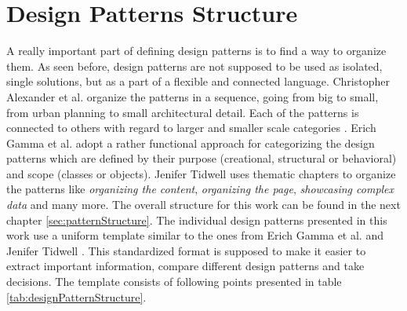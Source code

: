 \section{Design Patterns Structure}
A really important part of defining design patterns is to find a way to organize them. As seen before, design patterns are not supposed to be used as isolated, single solutions, but as a part of a flexible and connected language. Christopher Alexander et al. \cite{alexander1977pattern} organize the patterns in a sequence, going from big to small, from urban planning to small architectural detail. Each of the patterns is connected to others with regard to larger and smaller scale categories \cite[p.\,10--36]{alexander1977pattern}.  Erich Gamma et al. \cite{gamma1995design} adopt a rather functional approach for categorizing the design patterns which are defined by their purpose (creational, structural or behavioral) and scope (classes or objects). Jenifer Tidwell \cite{tidwell2010designing} uses thematic chapters to organize the patterns like \emph{organizing the content}, \emph{organizing the page}, \emph{showcasing complex data} and many more. The overall structure for this work can be found in the next chapter \ref{sec:patternStructure}. The individual design patterns presented in this work use a uniform template similar to the ones from Erich Gamma et al. \cite[p.\,16--18]{gamma1995design} and Jenifer Tidwell \cite[p.\,42--46]{tidwell2010designing}. This standardized format is supposed to make it easier to extract important information, compare different design patterns and take decisions. The template consists of following points presented in table \ref{tab:designPatternStructure}.




